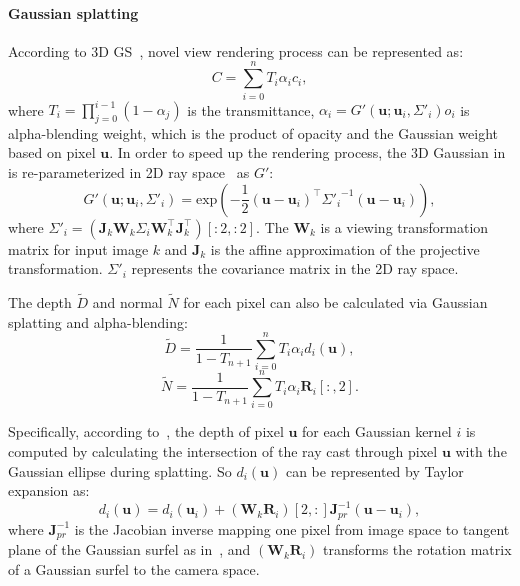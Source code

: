 \paragraph{Gaussian splatting}
According to 3D GS~\cite{kerbl20233d}, novel view rendering process can be represented as: 
\begin{equation}
    C=\sum_{i=0}^nT_i\alpha_ic_i,
\label{eq:gs_render}
\end{equation}
where $T_i=\prod_{j=0}^{i-1}(1-\alpha_j)$ is the transmittance, $\alpha_i = G'(\textbf{u};\textbf{u}_i,\Sigma'_i)o_i$ 
is alpha-blending weight, which is the product of opacity and the Gaussian weight based on pixel $\textbf{u}$. 
In order to speed up the rendering process, the 3D Gaussian in  
is re-parameterized in 2D ray space~\cite{zwicker2002ewa} as $G'$:
\begin{equation}
    G'(\textbf{u};\textbf{u}_i,\Sigma'_i)=\text{exp}(-\frac{1}{2}(\textbf{u}-\textbf{u}_i)^\top {\Sigma'_i}^{-1}(\textbf{u}-\textbf{u}_i)),
\end{equation}
where ${\Sigma'_i}= (\textbf{J}_k\textbf{W}_k\Sigma_i\textbf{W}_k^\top\textbf{J}_k^\top)[:2,:2]$. The $\textbf{W}_k$
is a viewing transformation matrix for input image $k$ and $\textbf{J}_k$ is the affine approximation of the projective transformation.
${\Sigma'_i}$ represents the covariance matrix in the 2D ray space.

The depth $\tilde{D}$ and normal $\tilde{N}$ for each pixel can also be
calculated via Gaussian splatting and alpha-blending:
\begin{equation}
        \tilde{D}=\frac{1}{1-T_{n+1}}\sum_{i=0}^{n}T_i\alpha_id_i(\textbf{u}),
\end{equation}
\begin{equation}
        \tilde{N}=\frac{1}{1-T_{n+1}}\sum_{i=0}^{n}T_i\alpha_i\textbf{R}_i[:,2].
\label{eq:gs_normal}
\end{equation}

Specifically, according to~\gs, the depth of pixel $\textbf{u}$ for each Gaussian kernel $i$
is computed by calculating the intersection of the ray cast through pixel $\textbf{u}$ 
with the Gaussian ellipse during splatting. So $d_i(\textbf{u})$ can be represented by Taylor expansion as:
\begin{equation}
    d_i(\textbf{u}) = d_i(\textbf{u}_i) + (\textbf{W}_k\textbf{R}_i)[2,:]\textbf{J}_{pr}^{-1}(\textbf{u}-\textbf{u}_i),
\end{equation}
where $\textbf{J}_{pr}^{-1}$ is the Jacobian inverse mapping one pixel from image space to tangent plane of the Gaussian surfel
as in~\cite{zwicker2001surface}, and $(\textbf{W}_k\textbf{R}_i)$ transforms the rotation matrix of a Gaussian surfel
to the camera space.

